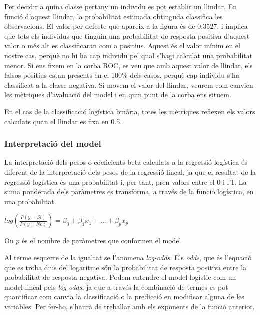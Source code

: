 \documentclass[12pt,longbibliography]{article}
\theoremstyle{definition}
\theoremstyle{remark}
\begin{document}
Per decidir a quina classe pertany un individu es pot establir un llindar. En funció d'aquest llindar, la probabilitat estimada obtinguda classifica les observacions. El valor per defecte que apareix a la figura és de 0,3527, i implica que tots els individus que tinguin una probabilitat de resposta positiva d'aquest valor o més alt es classificaran com a positius. Aquest és el valor mínim en el nostre cas, perquè no hi ha cap individu pel qual s'hagi calculat una probabilitat menor. Si ens fixem en la corba ROC, es veu que amb aquest valor de llindar, els falsos positius estan presents en el 100\% dels casos, perquè cap individu s'ha classificat a la classe negativa. Si movem el valor del llindar, veurem com canvien les mètriques d'avaluació del model i en quin punt de la corba ens situem.

En el cas de la classificació logística binària, totes les mètriques reflexen els valors calculats quan el llindar es fixa en 0.5.

\subsubsection{Interpretació del model}


La interpretació dels pesos o coeficients beta calculats a la regressió logística és diferent de la interpretació dels pesos de la regressió lineal, ja que el resultat de la regressió logística és una probabilitat i, per tant, pren valors entre el 0 i l'1. La suma ponderada dels paràmetres es transforma, a través de la funció logística, en una probabilitat.

\begin{center}

$log \left( \frac{P(y = Si)}{P(y = No)} \right) = \beta_0 + \beta_1 x_1 + ... + \beta_p x_p$

\end{center}

On $p$ és el nombre de paràmetres que conformen el model.



Al terme esquerre de la igualtat se l'anomena \emph{log-odds}. Els \emph{odds}, que és l'equació que es troba dins del logaritme són la probabilitat de resposta positiva entre la probabilitat de resposta negativa. Podem entendre el model logístic com un model lineal pels \emph{log-odds}, ja que a través la combinació de termes es pot quantificar com canvia la classificació o la predicció en modificar alguna de les variables. Per fer-ho, s'haurà de treballar amb els exponents de la funció anterior.
\end{document}
